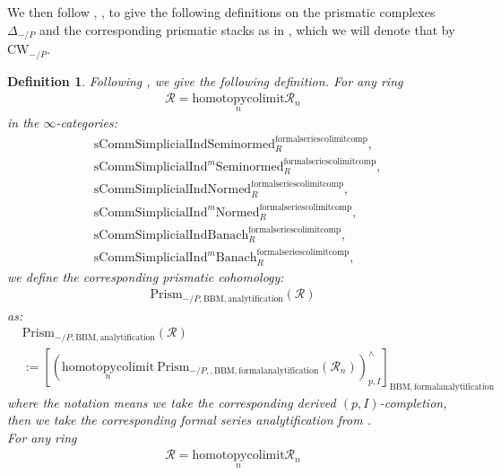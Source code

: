 \documentclass[12pt]{book}
\newtheorem{definition}{Definition}
\begin{document}
\indent We then follow \cite{BS}, \cite{BL}, \cite{Dr1} to give the following definitions on the prismatic complexes $\Delta_{-/P}$ and the corresponding prismatic stacks as in \cite{BL}, which we will denote that by $\mathrm{CW}_{-/P}$.



\begin{definition}
Following \cite[Construction 7.6]{BS}, \cite[Definition 3.1, Variant 5.1]{BL} we give the following definition. For any ring
\begin{align}
\mathcal{R}=\underset{n}{\mathrm{homotopycolimit}}\mathcal{R}_n	
\end{align}
in the $\infty$-categories:
\begin{align}
&\mathrm{sComm}\mathrm{Simplicial}\mathrm{Ind}\mathrm{Seminormed}^\mathrm{formalseriescolimitcomp}_R,\\
&\mathrm{sComm}\mathrm{Simplicial}\mathrm{Ind}^m\mathrm{Seminormed}^\mathrm{formalseriescolimitcomp}_R,\\
&\mathrm{sComm}\mathrm{Simplicial}\mathrm{Ind}\mathrm{Normed}^\mathrm{formalseriescolimitcomp}_R,\\
&\mathrm{sComm}\mathrm{Simplicial}\mathrm{Ind}^m\mathrm{Normed}^\mathrm{formalseriescolimitcomp}_R,\\
&\mathrm{sComm}\mathrm{Simplicial}\mathrm{Ind}\mathrm{Banach}^\mathrm{formalseriescolimitcomp}_R,\\
&\mathrm{sComm}\mathrm{Simplicial}\mathrm{Ind}^m\mathrm{Banach}^\mathrm{formalseriescolimitcomp}_R,	
\end{align}	
we define the corresponding prismatic cohomology:
\begin{align}
\mathrm{Prism}_{-/P,\mathrm{BBM},\mathrm{analytification}}(\mathcal{R})
\end{align}
as:
\begin{align}
&\mathrm{Prism}_{-/P,\mathrm{BBM},\mathrm{analytification}}(\mathcal{R})\\
&:=[(\underset{n}{\mathrm{homotopycolimit}}~ \mathrm{Prism}_{-/P,,\mathrm{BBM},\mathrm{formalanalytification}}(\mathcal{R}_n))^\wedge_{p,I}]_{\mathrm{BBM},\mathrm{formalanalytification}}	
\end{align}
where the notation means we take the corresponding derived $(p,I)$-completion, then we take the corresponding formal series analytification from \cite[4.2]{BBM}.\\
For any ring
\begin{align}
\mathcal{R}=\underset{n}{\mathrm{homotopycolimit}}\mathcal{R}_n	

\end{align}
\end{definition}
\end{document}
